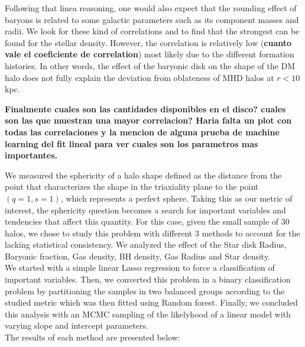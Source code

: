\documentclass[a4paper,fleqn,usenatbib]{mnras}
\begin{document}
Following that linea reasoning, one would also expect that the rounding
effect of baryons is related to some  galactic parameters such as its
component masses and radii. 
We look for these kind of correlations and to find that the strongest
can be found for the stellar density.
However, the correlation is relatively low ({\bf cuanto vale el
  coeficiente de correlation}) most likely due to the different
formation histories.
In other words, the effect of the baryonic disk on the shape of the DM halo
does not fully explain the deviation from oblateness of MHD halos at
$r<10$kpc. 

{\bf Finalmente cuales son las cantidades disponibles en el disco?
  cuales son las que muestran una mayor correlacion? Haria falta un
  plot con todas las correlaciones y la mencion de alguna prueba de
  machine learning del fit lineal para ver cuales son los parametros
  mas importantes.}
  
  We measured the sphericity of a halo shape defined as the distance 
  from the point that characterizes the shape in the triaxiality plane
  to the point $(q=1,s=1)$, which represents a perfect sphere. Taking this 
  as our metric of interest, the sphericity question becomes a search for
  important variables and tendencies that affect this quantity. For this case,
  given the small sample of 30 halos, we chose to study this problem with different 
  3 methods to account for the lacking statistical consistency. We analyzed the effect
  of the Star disk Radius, Baryonic fraction, Gas density, BH density, Gas Radius and
  Star density.\\
   
  We started with a simple linear Lasso regression to force a classification of 
  important variables. Then, we converted this problem in a binary classification problem
  by partitioning the samples in two balanced groups according to the studied metric which was then fitted using Random forest.
  Finally, we concluded this analysis with an MCMC sampling of the likelyhood of a linear model
  with varying slope and intercept parameters.\\
  
  The results of each method are presented below:
  
\end{document}
